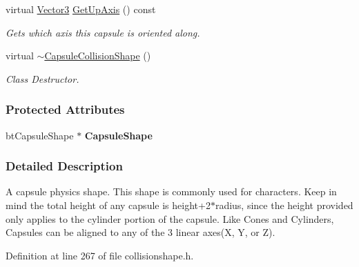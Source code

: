\begin{DoxyCompactItemize}
\item 
virtual \hyperlink{classphys_1_1Vector3}{Vector3} \hyperlink{classphys_1_1CapsuleCollisionShape_acde6b2a8631eecf06d1eff38e88fb734}{GetUpAxis} () const 
\begin{DoxyCompactList}\small\item\em Gets which axis this capsule is oriented along. \item\end{DoxyCompactList}\item 
\hypertarget{classphys_1_1CapsuleCollisionShape_ab621241d99ff8037fc5b81f275823d01}{
virtual \hyperlink{classphys_1_1CapsuleCollisionShape_ab621241d99ff8037fc5b81f275823d01}{$\sim$CapsuleCollisionShape} ()}
\label{classphys_1_1CapsuleCollisionShape_ab621241d99ff8037fc5b81f275823d01}

\begin{DoxyCompactList}\small\item\em Class Destructor. \item\end{DoxyCompactList}\end{DoxyCompactItemize}
\subsubsection*{Protected Attributes}
\begin{DoxyCompactItemize}
\item 
\hypertarget{classphys_1_1CapsuleCollisionShape_a16d71b1df42bd3ed59673c68ffd56fb7}{
btCapsuleShape $\ast$ {\bfseries CapsuleShape}}
\label{classphys_1_1CapsuleCollisionShape_a16d71b1df42bd3ed59673c68ffd56fb7}

\end{DoxyCompactItemize}


\subsubsection{Detailed Description}
A capsule physics shape. This shape is commonly used for characters. Keep in mind the total height of any capsule is height+2$\ast$radius, since the height provided only applies to the cylinder portion of the capsule. Like Cones and Cylinders, Capsules can be aligned to any of the 3 linear axes(X, Y, or Z). 

Definition at line 267 of file collisionshape.h.



